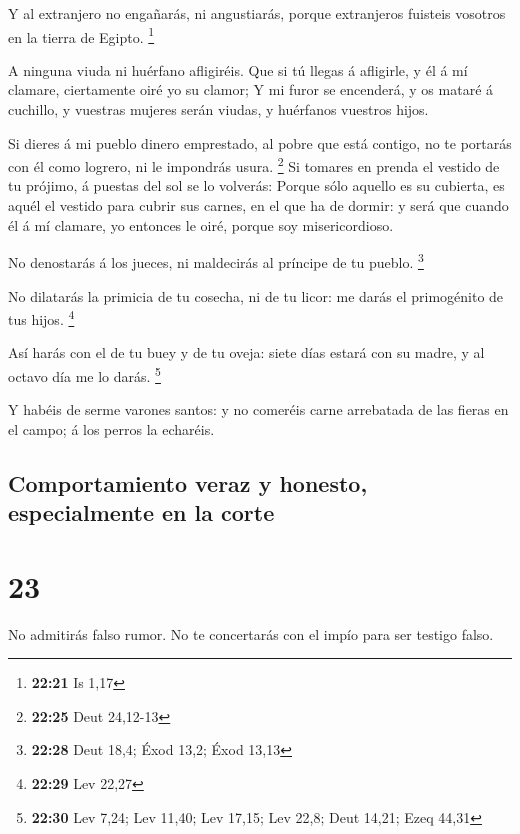  Y al extranjero no engañarás, ni angustiarás, porque
extranjeros fuisteis vosotros en la tierra de Egipto. \footnote{\textbf{22:21}
  Is 1,17}

 A ninguna viuda ni huérfano afligiréis. 
Que si tú llegas á afligirle, y él á mí clamare, ciertamente oiré yo su
clamor;  Y mi furor se encenderá, y os mataré á cuchillo,
y vuestras mujeres serán viudas, y huérfanos vuestros hijos.

 Si dieres á mi pueblo dinero emprestado, al pobre que
está contigo, no te portarás con él como logrero, ni le impondrás usura.
\footnote{\textbf{22:25} Deut 24,12-13}  Si tomares en
prenda el vestido de tu prójimo, á puestas del sol se lo volverás:
 Porque sólo aquello es su cubierta, es aquél el vestido
para cubrir sus carnes, en el que ha de dormir: y será que cuando él á
mí clamare, yo entonces le oiré, porque soy misericordioso.

 No denostarás á los jueces, ni maldecirás al príncipe de
tu pueblo. \footnote{\textbf{22:28} Deut 18,4; Éxod 13,2; Éxod 13,13}

 No dilatarás la primicia de tu cosecha, ni de tu licor:
me darás el primogénito de tus hijos. \footnote{\textbf{22:29} Lev 22,27}

 Así harás con el de tu buey y de tu oveja: siete días
estará con su madre, y al octavo día me lo darás. \footnote{\textbf{22:30}
  Lev 7,24; Lev 11,40; Lev 17,15; Lev 22,8; Deut 14,21; Ezeq 44,31}

 Y habéis de serme varones santos: y no comeréis carne
arrebatada de las fieras en el campo; á los perros la echaréis.

\hypertarget{comportamiento-veraz-y-honesto-especialmente-en-la-corte}{%
\subsection{Comportamiento veraz y honesto, especialmente en la
corte}\label{comportamiento-veraz-y-honesto-especialmente-en-la-corte}}

\hypertarget{section-22}{%
\section{23}\label{section-22}}

 No admitirás falso rumor. No te concertarás con el impío
para ser testigo falso.

